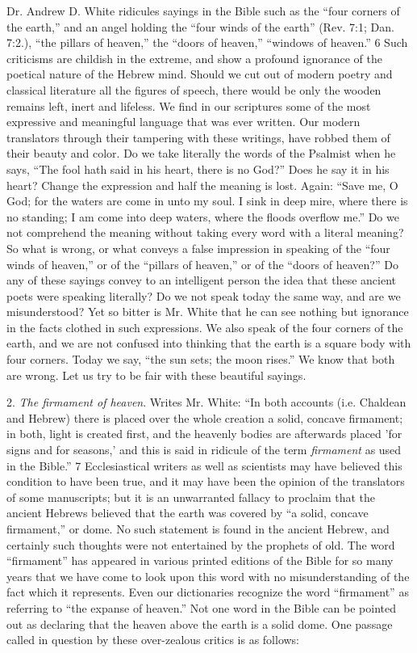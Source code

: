 Dr. Andrew D. White ridicules sayings in the Bible such as the ``four corners of the earth,''
and an angel holding the ``four winds of the earth'' (Rev. 7:1; Dan. 7:2.), ``the pillars of
heaven,'' the ``doors of heaven,'' ``windows of heaven.'' 6 Such criticisms are childish in the
extreme, and show a profound ignorance of the poetical nature of the Hebrew mind. Should
we cut out of modern poetry and classical literature all the figures of speech, there would be
only the wooden remains left, inert and lifeless. We find in our scriptures some of the most
expressive and meaningful language that was ever written. Our modern translators through
their tampering with these writings, have robbed them of their beauty and color. Do we take
literally the words of the Psalmist when he says, ``The fool hath said in his heart, there is no
God?'' Does he say it in his heart? Change the expression and half the meaning is lost. Again:
``Save me, O God; for the waters are come in unto my soul. I sink in deep mire, where there
is no standing; I am come into deep waters, where the floods overflow me.'' Do we not
comprehend the meaning without taking every word with a literal meaning? So what is
wrong, or what conveys a false impression in speaking of the ``four winds of heaven,'' or of
the ``pillars of heaven,'' or of the ``doors of heaven?'' Do any of these sayings convey to an
intelligent person the idea that these ancient poets were speaking literally? Do we not speak
today the same way, and are we misunderstood? Yet so bitter is Mr. White that he can see
nothing but ignorance in the facts clothed in such expressions. We also speak of the four
corners of the earth, and we are not confused into thinking that the earth is a square body
with four corners. Today we say, ``the sun sets; the moon rises.'' We know that both are
wrong. Let us try to be fair with these beautiful sayings.

2. \textit{The firmament of heaven}. Writes Mr. White: ``In both accounts (i.e. Chaldean and Hebrew)
there is placed over the whole creation a solid, concave firmament; in both, light is created
first, and the heavenly bodies are afterwards placed 'for signs and for seasons,' and this is said
in ridicule of the term \textit{firmament} as used in the Bible.'' 7 Ecclesiastical writers as well as
scientists may have believed this condition to have been true, and it may have been the
opinion of the translators of some manuscripts; but it is an unwarranted fallacy to proclaim
that the ancient Hebrews believed that the earth was covered by ``a solid, concave
firmament,'' or dome. No such statement is found in the ancient Hebrew, and certainly such
thoughts were not entertained by the prophets of old. The word ``firmament'' has appeared in
various printed editions of the Bible for so many years that we have come to look upon this
word with no misunderstanding of the fact which it represents. Even our dictionaries
recognize the word ``firmament'' as referring to ``the expanse of heaven.'' Not one word in the
Bible can be pointed out as declaring that the heaven above the earth is a solid dome. One
passage called in question by these over-zealous critics is as follows:


